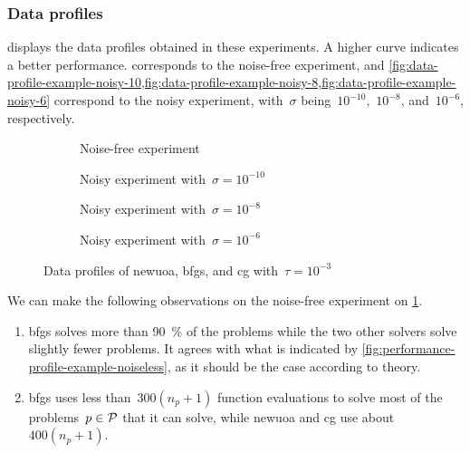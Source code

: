 \subsubsection{Data profiles}

 displays the data profiles obtained in these experiments.
A higher curve indicates a better performance.
 corresponds to the noise-free experiment, and \cref{fig:data-profile-example-noisy-10,fig:data-profile-example-noisy-8,fig:data-profile-example-noisy-6} correspond to the noisy experiment, with~$\sigma$ being~$10^{-10}$,~$10^{-8}$, and~$10^{-6}$, respectively.

\begin{figure}[ht]
    \centering
    \begin{subfigure}[b]{0.49\textwidth}
        \centering
        \caption{Noise-free experiment}
        \label{fig:data-profile-example-noiseless}
    \end{subfigure}
    \hfill
    \begin{subfigure}[b]{0.49\textwidth}
        \centering
        \caption{Noisy experiment with~$\sigma = 10^{-10}$}
        \label{fig:data-profile-example-noisy-10}
    \end{subfigure}
    \par\bigskip
    \begin{subfigure}[b]{0.49\textwidth}
        \centering
        \caption{Noisy experiment with~$\sigma = 10^{-8}$}
        \label{fig:data-profile-example-noisy-8}
    \end{subfigure}
    \hfill
    \begin{subfigure}[b]{0.49\textwidth}
        \centering
        \caption{Noisy experiment with~$\sigma = 10^{-6}$}
        \label{fig:data-profile-example-noisy-6}
    \end{subfigure}
    \caption{Data profiles of \gls{newuoa}, \gls{bfgs}, and \gls{cg} with~$\tau = 10^{-3}$}
    \label{fig:data-profile-example}
\end{figure}

We can make the following observations on the noise-free experiment on \cref{fig:data-profile-example-noiseless}.
\begin{enumerate}
    \item \Gls{bfgs} solves more than \SI{90}{\percent} of the problems while the two other solvers solve slightly fewer problems.
    It agrees with what is indicated by \cref{fig:performance-profile-example-noiseless}, as it should be the case according to theory.
    \item \Gls{bfgs} uses less than~$300 (n_p + 1)$ function evaluations to solve most of the problems~$p \in \mathcal{P}$ that it can solve, while \gls{newuoa} and \gls{cg} use about~$400 (n_p + 1)$.
\end{enumerate}

